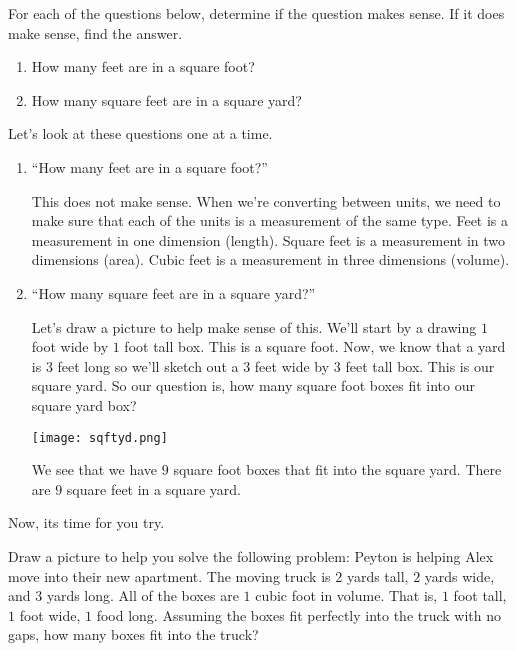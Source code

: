 \documentclass{ximera}
\begin{document}
\begin{example}

For each of the questions below, determine if the question makes sense.  If it does make sense, find the answer.

\begin{enumerate}[label=\alph*.]
\item How many feet are in a square foot?
\item How many square feet are in a square yard?
\end{enumerate}

\begin{explanation}
Let's look at these questions one at a time.
\begin{enumerate}[label=\alph*.]
\item ``How many feet are in a square foot?''  

This does not make sense.  When we're converting between units, we need to make sure that each of the units is a measurement of the same type.  Feet is a measurement in one dimension (length). Square feet is a measurement in two dimensions (area). Cubic feet is a measurement in three dimensions (volume).  \\

\item ``How many square feet are in a square yard?''  

Let's draw a picture to help make sense of this. We'll start by a drawing $1$ foot wide by $1$ foot tall box. This is a square foot. Now, we know that a yard is $3$ feet long so we'll sketch out a $3$ feet wide by $3$ feet tall box. This is our square yard. So our question is, how many square foot boxes fit into our square yard box? 

\begin{image}
    \texttt{[image: sqftyd.png]}
\end{image}

We see that we have $9$ square foot boxes that fit into the square yard.  There are $9$ square feet in a square yard.\\

\end{enumerate}
\end{explanation}
\end{example}

Now, its time for you try.

\begin{exploration}
Draw a picture to help you solve the following problem: Peyton is helping Alex move into their new apartment. The moving truck is $2$ yards tall, $2$ yards wide, and $3$ yards long. All of the boxes are $1$ cubic foot in volume.  That is, $1$ foot tall, $1$ foot wide, $1$ food long. Assuming the boxes fit perfectly into the truck with no gaps, how many boxes fit into the truck?
\end{exploration}
\end{document}
